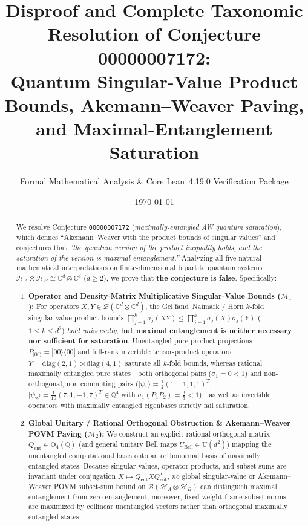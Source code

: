 \documentclass[11pt,a4paper]{article}
\title{\textbf{Disproof and Complete Taxonomic Resolution of Conjecture 00000007172:\\
Quantum Singular-Value Product Bounds, Akemann--Weaver Paving,\\
and Maximal-Entanglement Saturation}}
\author{Formal Mathematical Analysis \& Core Lean~4.19.0 Verification Package}
\date{\today}
\theoremstyle{plain}
\theoremstyle{definition}
\newcommand{\C}{\mathbb{C}}
\newcommand{\Q}{\mathbb{Q}}
\newcommand{\cH}{\mathcal{H}}
\newcommand{\cB}{\mathcal{B}}
\newcommand{\diag}{\mathrm{diag}}
\newcommand{\Orth}{\mathrm{O}}
\begin{document}
\maketitle

\begin{abstract}
We resolve Conjecture \texttt{00000007172} (\emph{maximally-entangled AW quantum saturation}), which defines ``Akemann--Weaver with the product bounds of singular values'' and conjectures that \emph{``the quantum version of the product inequality holds, and the saturation of the version is maximal entanglement.''} Analyzing all five natural mathematical interpretations on finite-dimensional bipartite quantum systems $\cH_A \otimes \cH_B \cong \C^d \otimes \C^d$ ($d \ge 2$), we prove that \textbf{the conjecture is false}. Specifically:
\begin{enumerate}
  \item \textbf{Operator and Density-Matrix Multiplicative Singular-Value Bounds ($\mathcal{M}_1$):} For operators $X, Y \in \cB(\C^d \otimes \C^d)$, the Gel'fand--Naimark / Horn $k$-fold singular-value product bounds $\prod_{j=1}^k \sigma_j(XY) \le \prod_{j=1}^k \sigma_j(X)\sigma_j(Y)$ ($1 \le k \le d^2$) \emph{hold universally}, \textbf{but maximal entanglement is neither necessary nor sufficient for saturation}. Unentangled pure product projections $P_{|00\rangle} = |00\rangle\langle 00|$ and full-rank invertible tensor-product operators $Y = \diag(2,1) \otimes \diag(4,1)$ saturate all $k$-fold bounds, whereas rational maximally entangled pure states---both orthogonal pairs ($\sigma_1 = 0 < 1$) and non-orthogonal, non-commuting pairs ($|\psi_1\rangle = \frac{1}{2}(1,-1,1,1)^T$, $|\psi_2\rangle = \frac{1}{10}(7,1,-1,7)^T \in \Q^4$ with $\sigma_1(P_1 P_2) = \frac{3}{5} < 1$)---as well as invertible operators with maximally entangled eigenbases strictly fail saturation.
  \item \textbf{Global Unitary / Rational Orthogonal Obstruction \& Akemann--Weaver POVM Paving ($\mathcal{M}_2$):} We construct an explicit rational orthogonal matrix $Q_{\mathrm{ent}} \in \Orth_4(\Q)$ (and general unitary Bell maps $U_{\mathrm{Bell}} \in \mathrm{U}(d^2)$) mapping the unentangled computational basis onto an orthonormal basis of maximally entangled states. Because singular values, operator products, and subset sums are invariant under conjugation $X \mapsto Q_{\mathrm{ent}} X Q_{\mathrm{ent}}^T$, \emph{no} global singular-value or Akemann--Weaver POVM subset-sum bound on $\cB(\cH_A \otimes \cH_B)$ can distinguish maximal entanglement from zero entanglement; moreover, fixed-weight frame subset norms are maximized by collinear unentangled vectors rather than orthogonal maximally entangled states.

\end{enumerate}
\end{abstract}
\end{document}
